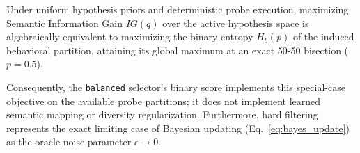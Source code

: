 \begin{theorem}
Under uniform hypothesis priors and deterministic probe execution, maximizing Semantic Information Gain $IG(q)$ over the active hypothesis space is algebraically equivalent to maximizing the binary entropy $H_b(p)$ of the induced behavioral partition, attaining its global maximum at an exact 50-50 bisection ($p = 0.5$).
\end{theorem}
Consequently, the \texttt{balanced} selector's binary score implements this special-case objective on the available probe partitions; it does not implement learned semantic mapping or diversity regularization. Furthermore, hard filtering represents the exact limiting case of Bayesian updating (Eq.~\ref{eq:bayes_update}) as the oracle noise parameter $\epsilon \to 0$.
